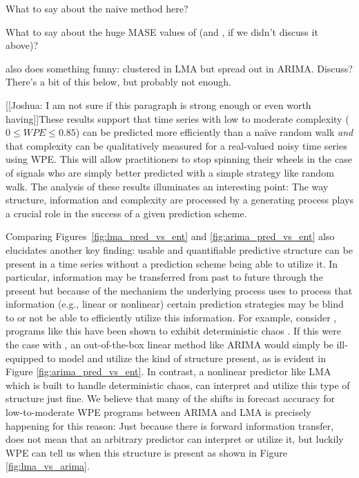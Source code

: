 {\color{red} What to say about the naive method here?}

{\color{red} What to say about the huge MASE values of \svdthree (and
  \svdfive, if we didn't discuss it above)?}

{\color{red} \col also does something funny: clustered in LMA but
  spread out in ARIMA.  Discuss?  There's a bit of this below, but
  probably not enough.}

[[Joshua: I am not sure if this paragraph is strong enough or even
    worth having]]These results support that time series with low to
moderate complexity ($0\le WPE \le 0.85$) can be predicted more
efficiently than a na\"ive random walk \emph{and} that complexity can
be qualitatively measured for a real-valued noisy time series using
WPE. This will allow practitioners to stop spinning their wheels in
the case of signals who are simply better predicted with a simple
strategy like random walk. The analysis of these results illuminates
an interesting point: The way structure, information and complexity
are processed by a generating process plays a crucial role in the
success of a given prediction scheme.



Comparing Figures~\ref{fig:lma_pred_vs_ent} and
\ref{fig:arima_pred_vs_ent} also elucidates another key finding:
usable and quantifiable predictive structure can be present in a time
series without a prediction scheme being able to utilize it. In
particular, information may be transferred from past to future through
the present but because of the mechanism the underlying process uses
to process that information (e.g., linear or nonlinear) certain
prediction strategies may be blind to or not be able to efficiently
utilize this information. For example, consider \col, programs like
this have been shown to exhibit deterministic chaos
\cite{mytkowicz09}. If this were the case with \col, an out-of-the-box
linear method like ARIMA would simply be ill-equipped to model and
utilize the kind of structure present, as is evident in Figure
\ref{fig:arima_pred_vs_ent}. In contrast, a nonlinear predictor like
LMA which is built to handle deterministic chaos, can interpret and
utilize this type of structure just fine. We believe that many of the
shifts in forecast accuracy for low-to-moderate WPE programs between
ARIMA and LMA is precisely happening for this reason: Just because
there is forward information transfer, does not mean that an arbitrary
predictor can interpret or utilize it, but luckily WPE can tell us
when this structure is present as shown in Figure
\ref{fig:lma_vs_arima}.

